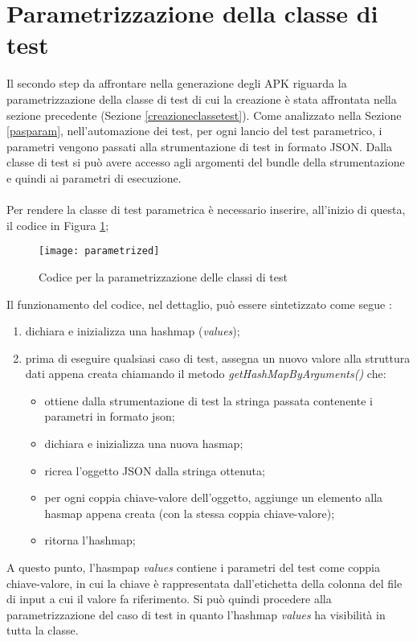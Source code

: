 \section{Parametrizzazione della classe di test}
\label{paramclasstest}
Il secondo step da affrontare nella generazione degli APK riguarda la parametrizzazione della classe di test di cui la creazione è stata affrontata nella sezione precedente (Sezione \ref{creazioneclassetest}). Come analizzato nella Sezione \ref{pasparam}, nell'automazione dei test, per ogni lancio del test parametrico, i parametri vengono passati  alla strumentazione di test in formato JSON. Dalla classe di test si può avere accesso agli argomenti del bundle della strumentazione e quindi ai parametri di esecuzione.
\\\\
\noindent Per rendere la classe di test parametrica è necessario inserire, all'inizio di questa, il codice in Figura \ref{fig:parametrized};

\begin{figure}[H]
	\texttt{[image: parametrized]}
	\centering
	\caption{Codice per la parametrizzazione delle classi di test}
    \label{fig:parametrized}
\end{figure}

\noindent Il funzionamento del codice, nel dettaglio, può essere sintetizzato come segue :
\begin{enumerate}[nosep]
\item dichiara e inizializza una hashmap (\emph{values});
\item prima di eseguire qualsiasi caso di test, assegna un nuovo valore alla struttura dati appena creata chiamando il metodo \emph{getHashMapByArguments()} che:
\begin{itemize} [nosep]
\item[1.] ottiene dalla strumentazione di test la stringa passata contenente i parametri in formato json;
\item[2.] dichiara e inizializza una nuova hasmap;
\item[3.] ricrea l'oggetto JSON dalla stringa ottenuta;
\item[4.] per ogni coppia chiave-valore dell'oggetto, aggiunge un elemento alla hasmap appena creata (con la stessa coppia chiave-valore);
\item[4.] ritorna l'hashmap;
\end{itemize}
\end{enumerate}
\bigskip
\noindent A questo punto, l'hasmpap \emph{values} contiene i parametri del test come coppia chiave-valore, in cui la chiave è rappresentata dall'etichetta della colonna del file di input a cui il valore fa riferimento. Si può quindi procedere alla parametrizzazione del caso di test in quanto l'hashmap \emph{values}  ha visibilità in tutta la classe.

